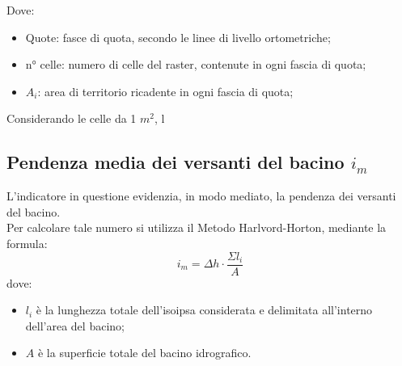 Dove:
\begin{itemize}
    \item Quote: fasce di quota, secondo le linee di livello ortometriche;
    \item n° celle: numero di celle del raster, contenute in ogni fascia di quota;
    \item $A_i$: area di territorio ricadente in ogni fascia di quota;
\end{itemize}
Considerando le celle da 1 $m^2$, l

\subsection{Pendenza media dei versanti del bacino $i_m$}
L'indicatore in questione evidenzia, in modo mediato, la pendenza dei versanti del bacino.\\
Per calcolare tale numero si utilizza il Metodo Harlvord-Horton, mediante la formula:
\begin{equation}
    i_m = \Delta h \cdot \frac{\Sigma l_i}{A}
\end{equation}
dove: 
\begin{itemize}
 \item $l_i$ è la lunghezza totale dell'isoipsa considerata e delimitata all'interno dell'area del bacino;
 \item $A$ è la superficie totale del bacino idrografico.
\end{itemize}

